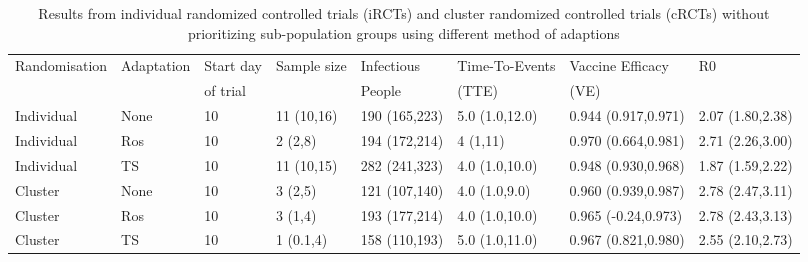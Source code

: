 \documentclass[a4paper]{article}
\begin{document}
	
	\begin{landscape}	
		\begin{table}[]
			\centering
			\caption{Results from individual randomized controlled trials (iRCTs) and cluster randomized controlled trials (cRCTs) without prioritizing sub-population groups using different method of adaptions}
			\label{trial_designs_without_priority}
			\begin{tabular}{|l|l|l|l|l|l|l|l|} \hline
				Randomisation & Adaptation & Start day & Sample size & Infectious & Time-To-Events & Vaccine Efficacy & R0\\
				& & of trial & & People & (TTE) & (VE)  & \\ \hline \hline
				Individual & None & 10 & 11 (10,16) & 190 (165,223) & 5.0 (1.0,12.0) & 0.944 (0.917,0.971) & 2.07 (1.80,2.38)\\ 
				Individual & Ros & 10 & 2 (2,8) & 194 (172,214) & 4 (1,11) & 0.970 (0.664,0.981) & 2.71 (2.26,3.00)\\ 
				Individual & TS & 10 & 11 (10,15) & 282 (241,323) & 4.0 (1.0,10.0) & 0.948 (0.930,0.968) & 1.87 (1.59,2.22)\\ \hline
				Cluster & None & 10 & 3 (2,5) & 121 (107,140) & 4.0 (1.0,9.0) & 0.960 (0.939,0.987) & 2.78 (2.47,3.11)\\
				Cluster & Ros & 10 & 3 (1,4) & 193 (177,214) & 4.0 (1.0,10.0) & 0.965 (-0.24,0.973) & 2.78 (2.43,3.13)\\
				Cluster & TS & 10 & 1 (0.1,4) & 158 (110,193) & 5.0 (1.0,11.0) & 0.967 (0.821,0.980) & 2.55 (2.10,2.73)\\ \hline \hline
			\end{tabular}
		\end{table}
		

\end{landscape}
\end{document}
